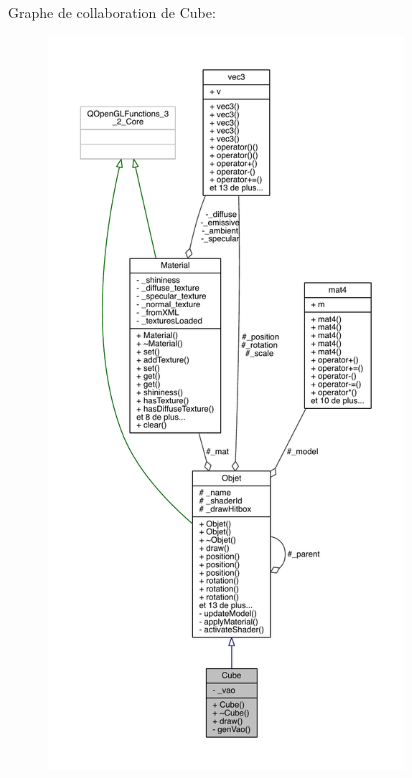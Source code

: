 Graphe de collaboration de Cube\+:
\nopagebreak
\begin{figure}[H]
\begin{center}
\leavevmode
\includegraphics[height=550pt]{class_cube__coll__graph}
\end{center}
\end{figure}
